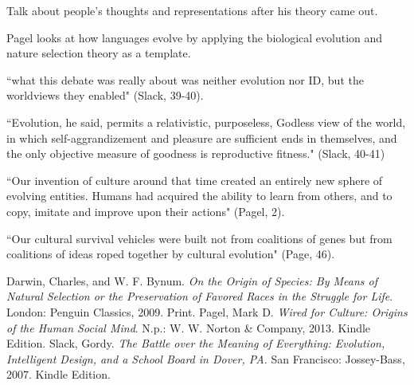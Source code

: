 \documentclass[11pt, oneside]{article}
\begin{document}
\par Talk about people's thoughts and representations after his theory came out.

\par Pagel looks at how languages evolve by applying the biological evolution and nature selection theory as a template. 

``what this debate was really about was neither evolution nor ID, but the worldviews they enabled" (Slack, 39-40).

``Evolution, he said, permits a relativistic, purposeless, Godless view of the world, in which self-aggrandizement and pleasure are sufficient ends in themselves, and the only objective measure of goodness is reproductive fitness." (Slack, 40-41)

``Our invention of culture around that time created an entirely new sphere of evolving entities. Humans had acquired the ability to learn from others, and to copy, imitate and improve upon their actions" (Pagel, 2).

``Our cultural survival vehicles were built not from coalitions of genes but from coalitions of ideas roped together by cultural evolution" (Page, 46).

\begin{thebibliography}{9}
	Darwin, Charles, and W. F. Bynum.
	\emph{On the Origin of Species: By Means of Natural Selection or the Preservation of Favored Races in the Struggle for Life}.
	London: Penguin Classics, 2009.
	Print.
	Pagel, Mark D. 
	\emph{Wired for Culture: Origins of the Human Social Mind}. 
	N.p.: W. W. Norton \& Company, 2013. 
	Kindle Edition. 
	Slack, Gordy. 
	\emph{The Battle over the Meaning of Everything: Evolution, Intelligent Design, and a School Board in Dover, PA.}
	San Francisco: Jossey-Bass, 2007. 
	Kindle Edition.
\end{thebibliography}
\end{document}
